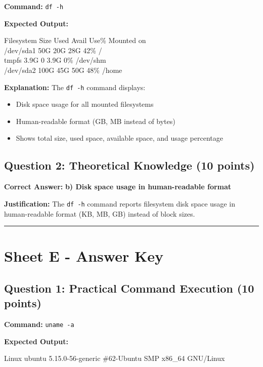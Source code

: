 \documentclass[a4paper,11pt]{article}
\begin{document}
\textbf{Command:} \texttt{df -h}

\textbf{Expected Output:}
\begin{tcolorbox}[colback=lightgray,colframe=primaryblue,boxrule=0.5pt]
\ttfamily\footnotesize
Filesystem      Size  Used Avail Use\% Mounted on\\
/dev/sda1        50G   20G   28G  42\% /\\
tmpfs           3.9G     0  3.9G   0\% /dev/shm\\
/dev/sda2       100G   45G   50G  48\% /home
\end{tcolorbox}

\textbf{Explanation:} The \texttt{df -h} command displays:
\begin{itemize}[leftmargin=*,itemsep=2pt]
    \item Disk space usage for all mounted filesystems
    \item Human-readable format (GB, MB instead of bytes)
    \item Shows total size, used space, available space, and usage percentage
\end{itemize}

\subsection*{Question 2: Theoretical Knowledge (10 points)}

\textbf{Correct Answer:} \textcolor{successgreen}{\textbf{b) Disk space usage in human-readable format}}

\textbf{Justification:} The \texttt{df -h} command reports filesystem disk space usage in human-readable format (KB, MB, GB) instead of block sizes.

\vspace{3mm}
\noindent\rule{\textwidth}{0.5pt}
\vspace{3mm}

\section*{Sheet E - Answer Key}

\subsection*{Question 1: Practical Command Execution (10 points)}

\textbf{Command:} \texttt{uname -a}

\textbf{Expected Output:}
\begin{tcolorbox}[colback=lightgray,colframe=primaryblue,boxrule=0.5pt]
\ttfamily\footnotesize
Linux ubuntu 5.15.0-56-generic \#62-Ubuntu SMP x86\_64 GNU/Linux
\end{tcolorbox}
\end{document}
